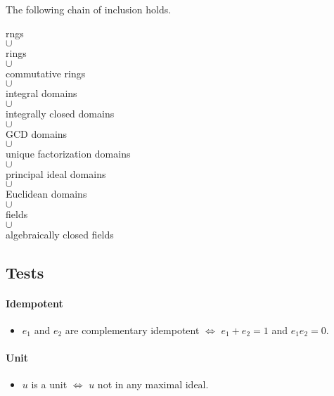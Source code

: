 \documentclass{article}
\begin{document}
The following chain of inclusion holds.
\begin{center}
    rngs \\
    $\cup$ \\
    rings \\
    $\cup$  \\
    commutative rings  \\
    $\cup$  \\
    integral domains \\
    $\cup$  \\
    integrally closed domains \\
    $\cup$  \\
    GCD domains \\
    $\cup$  \\
    unique factorization domains \\
    $\cup$  \\
    principal ideal domains \\
    $\cup$  \\
    Euclidean domains \\
    $\cup$  \\
    fields \\
    $\cup$  \\
    algebraically closed fields \\
\end{center}

\subsection*{Tests}

\paragraph*{Idempotent}
\begin{itemize}
    \item $e_1$ and $e_2$ are complementary idempotent $\Leftrightarrow$ $e_1+e_2=1$ and $e_1 e_2 = 0$.
\end{itemize}

\paragraph*{Unit}
\begin{itemize}
    \item $u$ is a unit $\Leftrightarrow$ $u$ not in any maximal ideal.
\end{itemize}
\end{document}
